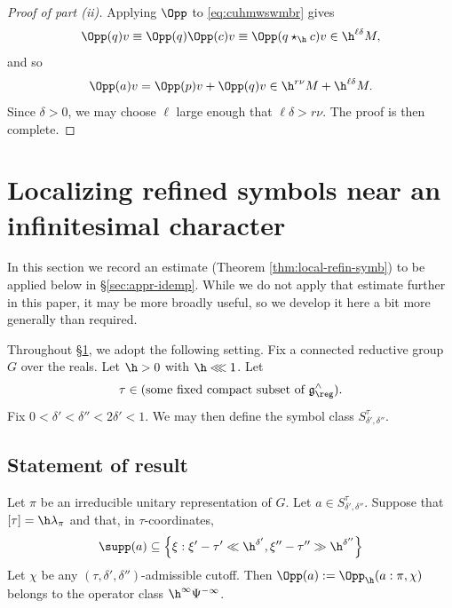 \begin{proof}[Proof of part (ii)]
  Applying \(\Opp\) to \eqref{eq:cuhmwswmbr} gives
  \[
    \Opp(q) v \equiv \Opp(q) \Opp(c) v \equiv \Opp(q \star_{\h} c) v \in \h^{\ell \delta } M,
  \]
  and so
  \[
    \Opp(a) v = \Opp(p) v + \Opp(q) v \in \h^{r \nu} M + \h^{\ell \delta} M.
  \]
  Since $\delta > 0$, we may choose $\ell$ large enough that $\ell \delta > r \nu$.  The proof is then complete.
\end{proof}




\section{Localizing refined symbols near an infinitesimal character
}\label{sec:local-refin-symb}
In this section we record an estimate (Theorem \ref{thm:local-refin-symb}) to be applied below in \S\ref{sec:appr-idemp}.  While we do not apply that estimate further in this paper, it may be more broadly useful, so we develop it here a bit more generally than required.

Throughout \S\ref{sec:local-refin-symb}, we adopt the following setting.  Fix a connected reductive group $G$ over the reals.  Let $\h > 0$ with $\h \lll 1$.  Let
\begin{equation}\label{eq:cuhnuoy8vh}
  \tau \in(\text{some fixed compact subset of } \mathfrak{g}^\wedge_{\reg}).
\end{equation}
Fix $0 < \delta ' < \delta '' < 2 \delta ' < 1$.  We may then define the symbol class $S^\tau_{\delta ', \delta ''}$.

\subsection{Statement of result}
\begin{theorem}\label{thm:local-refin-symb}
  Let $\pi$ be an irreducible unitary representation of $G$.
  Let $a \in S^\tau_{\delta', \delta ''}$.  Suppose that $[\tau] = \h \lambda_\pi$ and that, in $\tau$-coordinates,
  \begin{equation}\label{eqn:xi-delta-primez-tau}
    \supp(a) \subseteq
    \left\{\xi : \xi' - \tau ' \ll \h^{\delta '},
      \xi '' - \tau '' \gg \h^{\delta ''}
    \right\}
  \end{equation}
  Let $\chi$ be any $(\tau, \delta ', \delta '')$-admissible cutoff.  Then $\Opp(a) := \Opp_{\h}(a:\pi, \chi )$ belongs to the operator class $\h^\infty \Psi^{-\infty}$.
\end{theorem}

